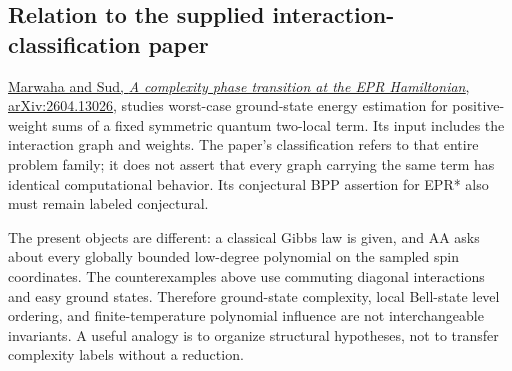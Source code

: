 \subsection{Relation to the supplied interaction-classification
paper}\label{proof:local_interactions:relation-to-the-supplied-interaction-classification-paper}

\href{https://arxiv.org/abs/2604.13026}{Marwaha and Sud, \emph{A
complexity phase transition at the EPR Hamiltonian}, arXiv:2604.13026},
studies worst-case ground-state energy estimation for positive-weight
sums of a fixed symmetric quantum two-local term. Its input includes the
interaction graph and weights. The paper's classification refers to that
entire problem family; it does not assert that every graph carrying the
same term has identical computational behavior. Its conjectural BPP
assertion for EPR* also must remain labeled conjectural.

The present objects are different: a classical Gibbs law is given, and
AA asks about every globally bounded low-degree polynomial on the
sampled spin coordinates. The counterexamples above use commuting
diagonal interactions and easy ground states. Therefore ground-state
complexity, local Bell-state level ordering, and finite-temperature
polynomial influence are not interchangeable invariants. A useful
analogy is to organize structural hypotheses, not to transfer complexity
labels without a reduction.
